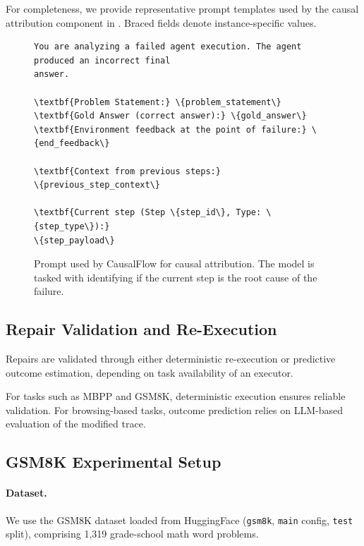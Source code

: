 \documentclass{article}
\theoremstyle{plain}
\theoremstyle{definition}
\theoremstyle{remark}
\begin{document}
For completeness, we provide representative prompt templates used by the causal attribution component in . Braced fields denote instance-specific values.

\begin{figure}[t]
\centering
\begin{tcolorbox}[colback=gray!5, colframe=gray!60, title=\textbf{Causal Attribution Prompt}, sharp corners=south]
    \begin{Verbatim}[fontsize=\footnotesize, commandchars=\\\{\}]
You are analyzing a failed agent execution. The agent produced an incorrect final
answer.

\textbf{Problem Statement:} \{problem_statement\}
\textbf{Gold Answer (correct answer):} \{gold_answer\}
\textbf{Environment feedback at the point of failure:} \{end_feedback\}

\textbf{Context from previous steps:}
\{previous_step_context\}

\textbf{Current step (Step \{step_id\}, Type: \{step_type\}):}
\{step_payload\}
    \end{Verbatim}
\end{tcolorbox}
\caption{Prompt used by CausalFlow for causal attribution. The model is tasked with identifying if the current step is the root cause of the failure.}
\label{fig:causal_prompt_templates}
\end{figure}

\subsection{Repair Validation and Re-Execution}

Repairs are validated through either deterministic re-execution or predictive outcome estimation, depending on task availability of an executor.

For tasks such as MBPP and GSM8K, deterministic execution ensures reliable validation. For browsing-based tasks, outcome prediction relies on LLM-based evaluation of the modified trace.

\subsection{GSM8K Experimental Setup}

\paragraph{Dataset.}
We use the GSM8K dataset \cite{cobbe2021gsm8k} loaded from HuggingFace (\texttt{gsm8k}, \texttt{main} config, \texttt{test} split), comprising 1,319 grade-school math word problems.
\end{document}
